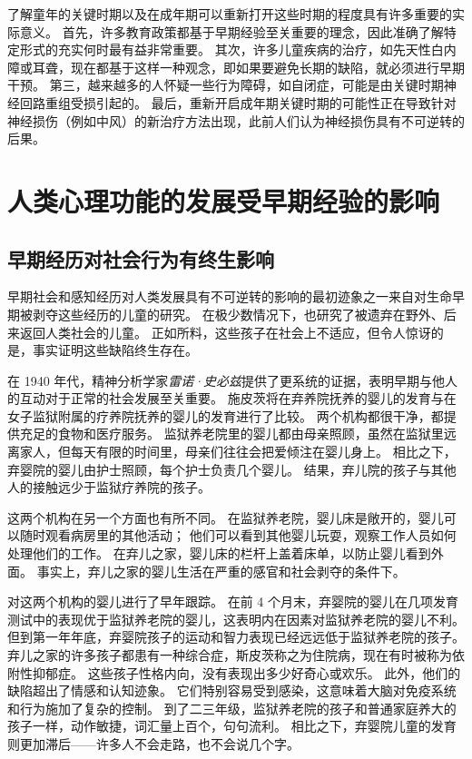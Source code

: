 了解童年的关键时期以及在成年期可以重新打开这些时期的程度具有许多重要的实际意义。
首先，许多教育政策都基于早期经验至关重要的理念，因此准确了解特定形式的充实何时最有益非常重要。
其次，许多儿童疾病的治疗，如先天性白内障或耳聋，现在都基于这样一种观念，即如果要避免长期的缺陷，就必须进行早期干预。
第三，越来越多的人怀疑一些行为障碍，如自闭症，可能是由关键时期神经回路重组受损引起的。
最后，重新开启成年期关键时期的可能性正在导致针对神经损伤（例如中风）的新治疗方法出现，此前人们认为神经损伤具有不可逆转的后果。



\section{人类心理功能的发展受早期经验的影响}

\subsection{早期经历对社会行为有终生影响}

早期社会和感知经历对人类发展具有不可逆转的影响的最初迹象之一来自对生命早期被剥夺这些经历的儿童的研究。
在极少数情况下，也研究了被遗弃在野外、后来返回人类社会的儿童。
正如所料，这些孩子在社会上不适应，但令人惊讶的是，事实证明这些缺陷终生存在。


在 1940 年代，精神分析学家\textit{雷诺·史必兹}提供了更系统的证据，表明早期与他人的互动对于正常的社会发展至关重要。
施皮茨将在弃养院抚养的婴儿的发育与在女子监狱附属的疗养院抚养的婴儿的发育进行了比较。
两个机构都很干净，都提供充足的食物和医疗服务。
监狱养老院里的婴儿都由母亲照顾，虽然在监狱里远离家人，但每天有限的时间里，母亲们往往会把爱倾注在婴儿身上。
相比之下，弃婴院的婴儿由护士照顾，每个护士负责几个婴儿。
结果，弃儿院的孩子与其他人的接触远少于监狱疗养院的孩子。


这两个机构在另一个方面也有所不同。
在监狱养老院，婴儿床是敞开的，婴儿可以随时观看病房里的其他活动；
他们可以看到其他婴儿玩耍，观察工作人员如何处理他们的工作。
在弃儿之家，婴儿床的栏杆上盖着床单，以防止婴儿看到外面。
事实上，弃儿之家的婴儿生活在严重的感官和社会剥夺的条件下。


对这两个机构的婴儿进行了早年跟踪。
在前 4 个月末，弃婴院的婴儿在几项发育测试中的表现优于监狱养老院的婴儿，这表明内在因素对监狱养老院的婴儿不利。
但到第一年年底，弃婴院孩子的运动和智力表现已经远远低于监狱养老院的孩子。
弃儿之家的许多孩子都患有一种综合症，斯皮茨称之为住院病，现在有时被称为依附性抑郁症。
这些孩子性格内向，没有表现出多少好奇心或欢乐。 此外，他们的缺陷超出了情感和认知迹象。
它们特别容易受到感染，这意味着大脑对免疫系统和行为施加了复杂的控制。
到了二三年级，监狱养老院的孩子和普通家庭养大的孩子一样，动作敏捷，词汇量上百个，句句流利。
相比之下，弃婴院儿童的发育则更加滞后——许多人不会走路，也不会说几个字。


